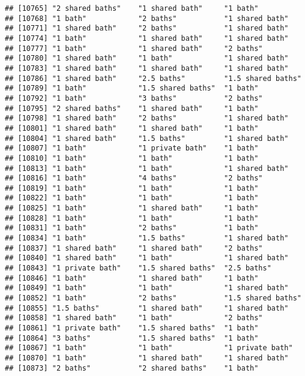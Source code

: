 \documentclass[
]{article}
\begin{document}
\begin{verbatim}
## [10765] "2 shared baths"    "1 shared bath"     "1 bath"           
## [10768] "1 bath"            "2 baths"           "1 shared bath"    
## [10771] "1 shared bath"     "2 baths"           "1 shared bath"    
## [10774] "1 bath"            "1 shared bath"     "1 shared bath"    
## [10777] "1 bath"            "1 shared bath"     "2 baths"          
## [10780] "1 shared bath"     "1 bath"            "1 shared bath"    
## [10783] "1 shared bath"     "1 shared bath"     "1 shared bath"    
## [10786] "1 shared bath"     "2.5 baths"         "1.5 shared baths" 
## [10789] "1 bath"            "1.5 shared baths"  "1 bath"           
## [10792] "1 bath"            "3 baths"           "2 baths"          
## [10795] "2 shared baths"    "1 shared bath"     "1 bath"           
## [10798] "1 shared bath"     "2 baths"           "1 shared bath"    
## [10801] "1 shared bath"     "1 shared bath"     "1 bath"           
## [10804] "1 shared bath"     "1.5 baths"         "1 shared bath"    
## [10807] "1 bath"            "1 private bath"    "1 bath"           
## [10810] "1 bath"            "1 bath"            "1 bath"           
## [10813] "1 bath"            "1 bath"            "1 shared bath"    
## [10816] "1 bath"            "4 baths"           "2 baths"          
## [10819] "1 bath"            "1 bath"            "1 bath"           
## [10822] "1 bath"            "1 bath"            "1 bath"           
## [10825] "1 bath"            "1 shared bath"     "1 bath"           
## [10828] "1 bath"            "1 bath"            "1 bath"           
## [10831] "1 bath"            "2 baths"           "1 bath"           
## [10834] "1 bath"            "1.5 baths"         "1 shared bath"    
## [10837] "1 shared bath"     "1 shared bath"     "2 baths"          
## [10840] "1 shared bath"     "1 bath"            "1 shared bath"    
## [10843] "1 private bath"    "1.5 shared baths"  "2.5 baths"        
## [10846] "1 bath"            "1 shared bath"     "1 bath"           
## [10849] "1 bath"            "1 bath"            "1 shared bath"    
## [10852] "1 bath"            "2 baths"           "1.5 shared baths" 
## [10855] "1.5 baths"         "1 shared bath"     "1 shared bath"    
## [10858] "1 shared bath"     "1 bath"            "2 baths"          
## [10861] "1 private bath"    "1.5 shared baths"  "1 bath"           
## [10864] "3 baths"           "1.5 shared baths"  "1 bath"           
## [10867] "1 bath"            "1 bath"            "1 private bath"   
## [10870] "1 bath"            "1 shared bath"     "1 shared bath"    
## [10873] "2 baths"           "2 shared baths"    "1 bath"           

\end{verbatim}
\end{document}
